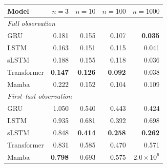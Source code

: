 \begin{tabular}{lrrrr}
\toprule
Model & $n{=}3$ & $n{=}10$ & $n{=}100$ & $n{=}1000$ \\
\midrule
\multicolumn{5}{l}{\emph{Full observation}} \\
GRU & 0.181 & 0.155 & 0.107 & \textbf{0.035} \\
LSTM & 0.163 & 0.151 & 0.115 & 0.041 \\
sLSTM & 0.188 & 0.155 & 0.118 & 0.036 \\
Transformer & \textbf{0.147} & \textbf{0.126} & \textbf{0.092} & 0.038 \\
Mamba & 0.222 & 0.152 & 0.104 & 0.109 \\
\midrule
\multicolumn{5}{l}{\emph{First--last observation}} \\
GRU & 1.050 & 0.540 & 0.443 & 0.424 \\
LSTM & 0.935 & 0.681 & 0.392 & 0.698 \\
sLSTM & 0.848 & \textbf{0.414} & \textbf{0.258} & \textbf{0.262} \\
Transformer & 0.831 & 0.585 & 0.470 & 0.571 \\
Mamba & \textbf{0.798} & 0.693 & 0.575 & $2.0\!\times\!10^{6}$ \\
\bottomrule
\end{tabular}
